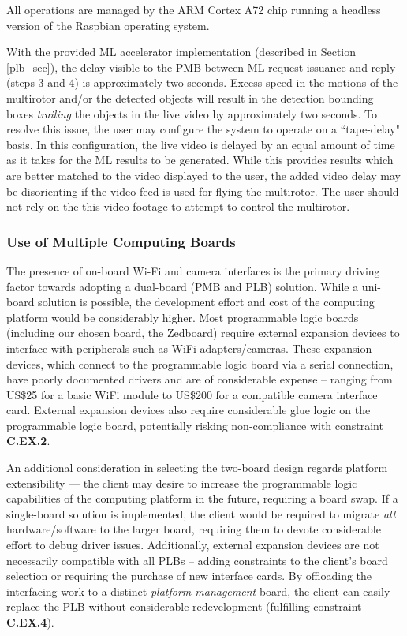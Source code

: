 All operations are managed by the ARM Cortex A72 chip running a headless version of the Raspbian operating system. 

With the provided ML accelerator implementation (described in Section \ref{plb_sec}), the delay visible to the PMB between ML request issuance and reply (steps 3 and 4) is approximately two seconds. Excess speed in the motions of the multirotor and/or the detected objects will result in the detection bounding boxes \textit{trailing} the objects in the live video by approximately two seconds. To resolve this issue, the user may configure the system to operate on a ``tape-delay" basis. In this configuration, the live video is delayed by an equal amount of time as it takes for the ML results to be generated. While this provides results which are better matched to the video displayed to the user, the added video delay may be disorienting if the video feed is used for flying the multirotor. The user should not rely on the this video footage to attempt to control the multirotor.

\subsubsection{Use of Multiple Computing Boards}
The presence of on-board Wi-Fi and camera interfaces is the primary driving factor towards adopting a dual-board (PMB and PLB) solution. While a uni-board solution is possible, the development effort and cost of the computing platform would be considerably higher. Most programmable logic boards (including our chosen board, the Zedboard) require external expansion devices to interface with peripherals such as WiFi adapters/cameras. These expansion devices, which connect to the programmable logic board via a serial connection, have poorly documented drivers and are of considerable expense -- ranging from US\$25 for a basic WiFi module\cite{digiwifi} to US\$200 for a compatible camera interface card\cite{digipmod}. External expansion devices also require considerable glue logic on the programmable logic board, potentially risking non-compliance with constraint \textbf{C.EX.2}.

An additional consideration in selecting the two-board design regards platform extensibility --- the client may desire to increase the programmable logic capabilities of the computing platform in the future, requiring a board swap. If a single-board solution is implemented, the client would be required to migrate \textit{all} hardware/software to the larger board, requiring them to devote considerable effort to debug driver issues. Additionally, external expansion devices are not necessarily compatible with all PLBs -- adding constraints to the client's board selection or requiring the purchase of new interface cards. By offloading the interfacing work to a distinct \textit{platform management} board, the client can easily replace the PLB without considerable redevelopment (fulfilling constraint \textbf{C.EX.4}). 

